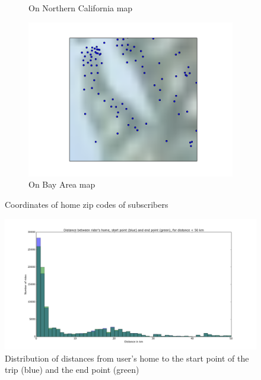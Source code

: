 \documentclass{article}
\begin{document}
\begin{figure}
\begin{subfigure}[b]{0.4\textwidth}
                \caption{On Northern California map}
                \label{fig:homezips:norcal}
        \end{subfigure}
        \begin{subfigure}[b]{0.4\textwidth}
                \includegraphics[width=\textwidth]{../home_zips_bay_area.png}
                \caption{On Bay Area map}
                \label{fig:homezips:}
        \end{subfigure}
        \caption{Coordinates of home zip codes of subscribers}
        \label{fig:homezips}
\end{figure}

\begin{figure}
	\centering
	\includegraphics[width=\textwidth]{../start_end_home.png}
	\caption{Distribution of distances from user's home to the start point of the trip (blue) and the end point (green)}
	\label{fig:startendhome}
\end{figure}
\end{document}
